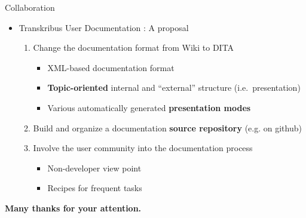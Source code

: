 \documentclass{bbawslides}
\begin{document}
\begin{bbawslide}{Collaboration}
  \vspace*{7mm}%
  \centerslidestrue%
  \begin{itemize}
    \item Transkribus User Documentation : A proposal
    \begin{enumerate}[leftmargin=*, align=left, label=\arabic*. Step:]\small
			\item Change the documentation format from Wiki to DITA
      \begin{itemize}\small
        \item XML-based documentation format
        \item \textbf{Topic-oriented} internal and \enquote{external} structure (i.e.~presentation)
        \item Various automatically generated \textbf{presentation modes}
      \end{itemize}
			\item Build and organize a documentation \textbf{source repository} (e.g. on github)
      \item Involve the user community into the documentation process
      \begin{itemize}\small
        \item Non-developer view point
        \item Recipes for frequent tasks
      \end{itemize}
    \end{enumerate}
  \end{itemize}
\end{bbawslide}

\begin{bbawpart}{\Large\bf Many thanks for your attention.}
\end{bbawpart}
\end{document}
